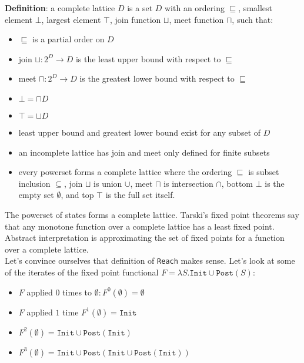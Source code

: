 \documentclass[11pt]{article}
\theoremstyle{definition}
\theoremstyle{plain}
\newcommand{\bottom}{\bot}
\begin{document}
\noindent \textbf{Definition}: a complete lattice $D$ is a set $D$ with an ordering $\sqsubseteq$, smallest element $\bottom$, largest element $\top$, 
join function $\sqcup$, meet function $\sqcap$, such that:
\begin{itemize}
    \item $\sqsubseteq$ is a partial order on $D$
    \item join $\sqcup: 2^D \rightarrow D$ is the least upper bound with respect to $\sqsubseteq$
    \item meet $\sqcap: 2^D \rightarrow D$ is the greatest lower bound with respect to $\sqsubseteq$
    \item $\bottom = \sqcap D$
    \item $\top = \sqcup D$
    \item least upper bound and greatest lower bound exist for any subset of $D$
    \item an incomplete lattice has join and meet only defined for finite subsets
    \item every powerset forms a complete lattice where the ordering $\sqsubseteq$ is subset inclusion $\subseteq$,
          join $\sqcup$ is union $\cup$, meet $\sqcap$ is intersection $\cap$, bottom $\bottom$ is the empty set $\emptyset$,
          and top $\top$ is the full set itself. 
\end{itemize}


\noindent The powerset of states forms a complete lattice. Tarski's fixed point theorems say that
any monotone function over a complete lattice has a least fixed point. Abstract interpretation is approximating the set of fixed points for a function over a complete lattice.\\

\noindent Let's convince ourselves that definition of \texttt{Reach} makes sense. 
Let's look at some of the iterates of the fixed point functional $F=\lambda S. \texttt{Init} \cup \texttt{Post}(S)$:
\begin{itemize}
    \item $F$ applied $0$ times to $\emptyset: F^0(\emptyset) = \emptyset$
    \item $F$ applied $1$ time $F^1(\emptyset) = \texttt{Init}$
    \item $F^2(\emptyset) = \texttt{Init} \cup \texttt{Post}(\texttt{Init})$
    \item $F^3(\emptyset) = \texttt{Init} \cup \texttt{Post}(\texttt{Init} \cup \texttt{Post}(\texttt{Init}))$
\end{itemize}
\end{document}
